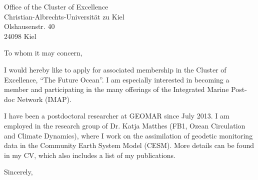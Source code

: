 \documentclass[
	pagenumber=false, %
	parskip=half, %
	fromalign=right, %
	foldmarks=true, %
	addrfield=true %
	]{scrlttr2}
\date{\today} %
\begin{document}
 
\begin{letter}{Office of the Cluster of Excellence \\ Christian-Albrechts-Universit\"at zu Kiel \\ Olshausenstr. 40 \\ 24098 Kiel} %


\opening{To whom it may concern,}

I would hereby like to apply for associated membership in the Cluster of Excellence, ``The Future Ocean''.  I am especially interested in becoming a member  and participating in the many offerings of the Integrated Marine Post-doc Network (IMAP).

I have been a postdoctoral researcher at GEOMAR since July 2013.  
I am employed in the research group of Dr. Katja Matthes (FB1, Ozean Circulation and Climate Dynamics), where I work on the assimilation of geodetic monitoring data in the Community Earth System Model (CESM).  More details can be found in my CV, which also includes a list of my publications.

\closing{Sincerely,}



\end{letter}
 
\end{document}
